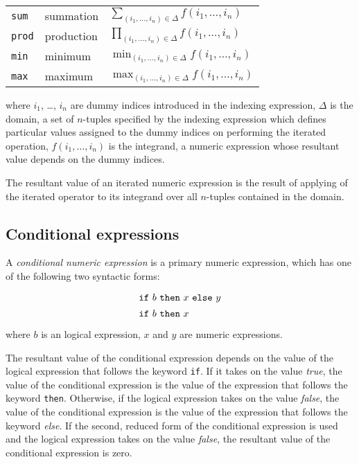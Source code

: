 \documentclass[11pt]{report}
\begin{document}
{\def\arraystretch{2}
\noindent\hfil
\begin{tabular}{@{}lll@{}}
{\tt sum}&summation&$\displaystyle\sum_{(i_1,\dots,i_n)\in\Delta}
f(i_1,\dots,i_n)$\\
{\tt prod}&production&$\displaystyle\prod_{(i_1,\dots,i_n)\in\Delta}
f(i_1,\dots,i_n)$\\
{\tt min}&minimum&$\displaystyle\min_{(i_1,\dots,i_n)\in\Delta}
f(i_1,\dots,i_n)$\\
{\tt max}&maximum&$\displaystyle\max_{(i_1,\dots,i_n)\in\Delta}
f(i_1,\dots,i_n)$\\
\end{tabular}
}

\noindent where $i_1$, \dots, $i_n$ are dummy indices introduced in
the indexing expression, $\Delta$ is the domain, a set of $n$-tuples
specified by the indexing expression which defines particular values
assigned to the dummy indices on performing the iterated operation,
$f(i_1,\dots,i_n)$ is the integrand, a numeric expression whose
resultant value depends on the dummy indices.

The resultant value of an iterated numeric expression is the result of
applying of the iterated operator to its integrand over all $n$-tuples
contained in the domain.

\subsection{Conditional expressions}
\label{ifthen}

A {\it conditional numeric expression} is a primary numeric expression,
which has one of the following two syntactic forms:
$$
{\def\arraystretch{1.4}
\begin{array}{l}
\mbox{{\tt if} $b$ {\tt then} $x$ {\tt else} $y$}\\
\mbox{{\tt if} $b$ {\tt then} $x$}\\
\end{array}
}
$$
where $b$ is an logical expression, $x$ and $y$ are numeric
expressions.

The resultant value of the conditional expression depends on the value
of the logical expression that follows the keyword {\tt if}. If it
takes on the value {\it true}, the value of the conditional expression
is the value of the expression that follows the keyword {\tt then}.
Otherwise, if the logical expression takes on the value {\it false},
the value of the conditional expression is the value of the expression
that follows the keyword {\it else}. If the second, reduced form of the
conditional expression is used and the logical expression takes on the
value {\it false}, the resultant value of the conditional expression is
zero.
\end{document}
